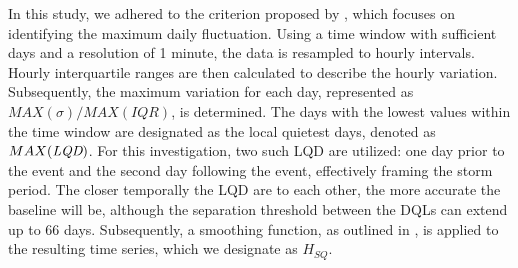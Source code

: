 \documentclass[12pt]{article}
\begin{document}
In this study, we adhered to the criterion proposed by \cite{vanKampt}, which focuses on identifying the maximum daily fluctuation. Using a time window with sufficient days and a resolution of 1 minute, the data is resampled to hourly intervals. Hourly interquartile ranges are then calculated to describe the hourly variation. Subsequently, the maximum variation for each day, represented as $MAX(\sigma)/MAX(IQR)$, is determined. The days with the lowest values within the time window are designated as the local quietest days, denoted as $MAX(\emph{LQD})$. For this investigation, two such LQD are utilized: one day prior to the event and the second day following the event, effectively framing the storm period. The closer temporally the LQD are to each other, the more accurate the baseline will be, although the separation threshold between the DQLs can extend up to 66 days. Subsequently, a smoothing function, as outlined in \cite{baseline_Gjerloev}, is applied to the resulting time series, which we designate as $H_{SQ}$.\\
\end{document}

